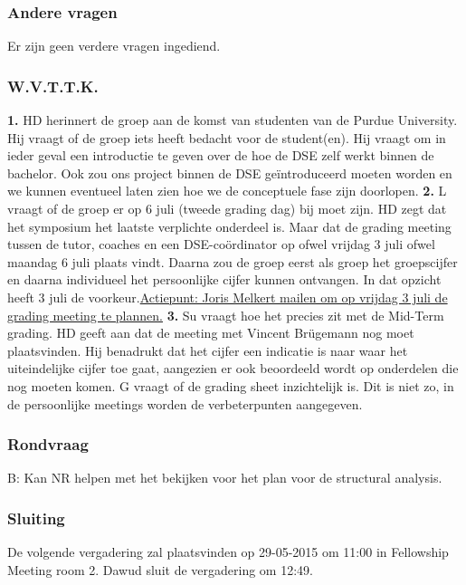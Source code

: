 \subsubsection{Andere vragen}
Er zijn geen verdere vragen ingediend.

\subsubsection{W.V.T.T.K.}
\textbf{1.} HD herinnert de groep aan de komst van studenten van de Purdue University. Hij vraagt of de groep iets heeft bedacht voor de student(en). Hij vraagt om in ieder geval een introductie te geven over de hoe de DSE zelf werkt binnen de bachelor. Ook zou ons project binnen de DSE ge\"{i}ntroduceerd moeten worden en we kunnen eventueel laten zien hoe we de conceptuele fase zijn doorlopen.
\newline\newline
\textbf{2.} L vraagt of de groep er op 6 juli (tweede grading dag) bij moet zijn. HD zegt dat het symposium het laatste verplichte onderdeel is. Maar dat de grading meeting tussen de tutor, coaches en een DSE-co\"{o}rdinator op ofwel vrijdag 3 juli ofwel maandag 6 juli plaats vindt. Daarna zou de groep eerst als groep het groepscijfer en daarna individueel het persoonlijke cijfer kunnen ontvangen. In dat opzicht heeft 3 juli de voorkeur.\newline \underline{Actiepunt: Joris Melkert mailen om op vrijdag 3 juli de grading meeting te plannen.}
\newline\newline
\textbf{3.} Su vraagt hoe het precies zit met de Mid-Term grading. HD geeft aan dat de meeting met Vincent Br\"{u}gemann nog moet plaatsvinden. Hij benadrukt dat het cijfer een indicatie is naar waar het uiteindelijke cijfer toe gaat, aangezien er ook beoordeeld wordt op onderdelen die nog moeten komen. G vraagt of de grading sheet inzichtelijk is. Dit is niet zo, in de persoonlijke meetings worden de verbeterpunten aangegeven.

\subsubsection{Rondvraag}
B: Kan NR helpen met het bekijken voor het plan voor de structural analysis.

\subsubsection{Sluiting}
De volgende vergadering zal plaatsvinden op 29-05-2015 om 11:00 in Fellowship Meeting room 2.
\newline\newline
Dawud sluit de vergadering om 12:49.